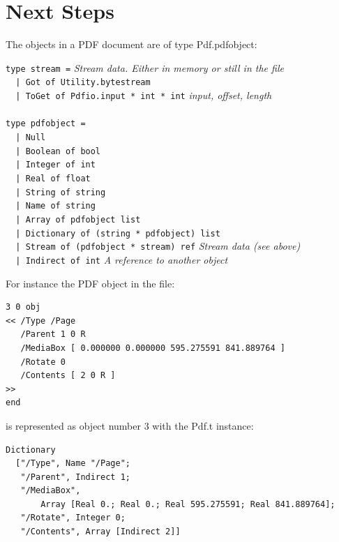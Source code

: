 \documentclass[a4paper]{memoir}
\begin{document}
\section*{Next Steps}
The objects in a PDF document are of type \textsf{Pdf.pdfobject}:
\begin{framed}
\noindent\verb!type stream =! \textit{Stream data. Either in memory or still in the file}\\
\verb!  | Got of Utility.bytestream!\\
\verb!  | ToGet of Pdfio.input * int * int! \textit{input, offset, length}\\
\verb!!\\
\verb!type pdfobject =!\\
\verb!  | Null!\\
\verb!  | Boolean of bool!\\
\verb!  | Integer of int!\\
\verb!  | Real of float!\\
\verb!  | String of string!\\
\verb!  | Name of string!\\
\verb!  | Array of pdfobject list!\\
\verb!  | Dictionary of (string * pdfobject) list!\\
\verb!  | Stream of (pdfobject * stream) ref! \textit{Stream data (see above)}\\
\verb!  | Indirect of int! \textit{A reference to another object}\\
\end{framed}

\clearpage

\noindent For instance the PDF object in the file:

\begin{framed}
\begin{verbatim}
3 0 obj
<< /Type /Page
   /Parent 1 0 R
   /MediaBox [ 0.000000 0.000000 595.275591 841.889764 ]
   /Rotate 0
   /Contents [ 2 0 R ]
>>
end
\end{verbatim}
\end{framed}

\noindent is represented as object number 3 with the Pdf.t instance:
\begin{framed}
\small\begin{verbatim}
Dictionary
  ["/Type", Name "/Page";
   "/Parent", Indirect 1;
   "/MediaBox",
       Array [Real 0.; Real 0.; Real 595.275591; Real 841.889764];
   "/Rotate", Integer 0;
   "/Contents", Array [Indirect 2]]
\end{verbatim}
\end{framed}
\end{document}
